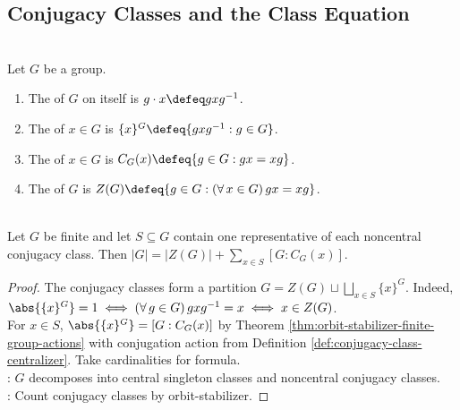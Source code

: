 \subsection{Conjugacy Classes and the Class Equation}

\begin{definition} \label{def:conjugacy-class-centralizer} \\
Let $G$ be a group.
\begin{enumerate}[label=(\roman*)]
\setlength{\itemsep}{0pt}
\item The  of $G$ on itself is $g\cdot x\defeq gxg^{-1}$.
\item The  of $x\in G$ is $\{x\}^{G}\defeq\{gxg^{-1}:g\in G\}$.
\item The  of $x\in G$ is $C_G(x)\defeq\{g\in G:gx=xg\}$.
\item The  of $G$ is $Z(G)\defeq\{g\in G:(\forall\,x\in G)\,gx=xg\}$.
\end{enumerate}
\end{definition}

\begin{theorem} \label{thm:finite-group-class-equation} \\
Let $G$ be finite and let $S\subseteq G$ contain one representative of each noncentral conjugacy class. Then $|G|=|Z(G)|+\sum\limits_{x\in S}[G:C_G(x)]$.
\begin{proof}
The conjugacy classes form a partition $G=Z(G)\sqcup\bigsqcup\limits_{x\in S}\{x\}^{G}$. Indeed, $\abs{\{x\}^{G}}=1 \iff (\forall\,g\in G)\,gxg^{-1}=x \iff x\in Z(G)$.\\
For $x\in S$, $\abs{\{x\}^{G}}=[G:C_G(x)]$ by Theorem \ref{thm:orbit-stabilizer-finite-group-actions} with conjugation action from Definition \ref{def:conjugacy-class-centralizer}. Take cardinalities for formula.\\
: $G$ decomposes into central singleton classes and noncentral conjugacy classes.\\
: Count conjugacy classes by orbit-stabilizer.
\end{proof}
\end{theorem}
